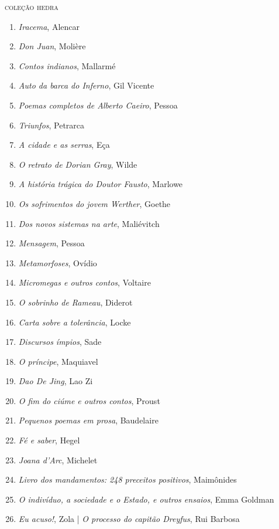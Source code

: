 \ifodd\thepage\paginabranca\else\clearpage\fi
\pagestyle{empty}

\begingroup
\fontsize{7}{8}\selectfont
{\large\textsc{coleção hedra}}\\
\begin{enumerate}
\setlength\parskip{4.2pt}
\setlength\itemsep{-1.4mm}
\item \textit{Iracema}, Alencar
\item \textit{Don Juan}, Molière
\item \textit{Contos indianos}, Mallarmé
\item \textit{Auto da barca do Inferno}, Gil Vicente
\item \textit{Poemas completos de Alberto Caeiro}, Pessoa
\item \textit{Triunfos}, Petrarca
\item \textit{A cidade e as serras}, Eça
\item \textit{O retrato de Dorian Gray}, Wilde
\item \textit{A história trágica do Doutor Fausto}, Marlowe
\item \textit{Os sofrimentos do jovem Werther}, Goethe
\item \textit{Dos novos sistemas na arte}, Maliévitch
\item \textit{Mensagem}, Pessoa
\item \textit{Metamorfoses}, Ovídio
\item \textit{Micromegas e outros contos}, Voltaire
\item \textit{O sobrinho de Rameau}, Diderot
\item \textit{Carta sobre a tolerância}, Locke
\item \textit{Discursos ímpios}, Sade
\item \textit{O príncipe}, Maquiavel
\item \textit{Dao De Jing}, Lao Zi
\item \textit{O fim do ciúme e outros contos}, Proust
\item \textit{Pequenos poemas em prosa}, Baudelaire
\item \textit{Fé e saber}, Hegel
\item \textit{Joana d'Arc}, Michelet
\item \textit{Livro dos mandamentos: 248 preceitos positivos}, Maimônides
\item \textit{O indivíduo, a sociedade e o Estado, e outros ensaios}, Emma Goldman
\item \textit{Eu acuso!}, Zola | \textit{O processo do capitão Dreyfus}, Rui Barbosa

\end{enumerate}
